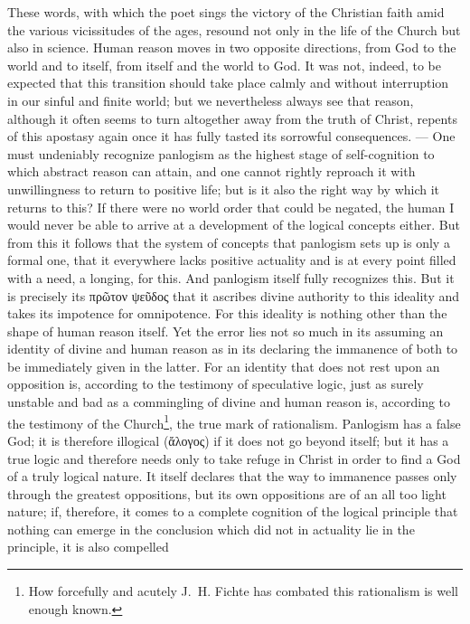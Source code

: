 \documentclass[12pt]{book}
\newcommand{\opage}[1]{\marginnote{\footnotesize\textit{[#1]}}}
\begin{document}
These words, with which the poet sings the victory of the Christian faith amid
the various vicissitudes of the ages, resound not only in the life of the Church
but also in science. Human reason moves in two opposite directions, from God to
the world and to itself, from itself and the world
\opage{144} \setcounter{footnote}{0}%
to God. It was not, indeed, to be expected that this transition should take
place calmly and without interruption in our sinful and finite world; but we
nevertheless always see that reason, although it often seems to turn altogether
away from the truth of Christ, repents of this apostasy again once it has fully
tasted its sorrowful consequences. --- One must undeniably recognize panlogism
as the highest stage of self-cognition to which abstract reason can attain, and
one cannot rightly reproach it with unwillingness to return to positive life;
but is it also the right way by which it returns to this? If there were no
world order that could be negated, the human I would never be able to arrive at
a development of the logical concepts either. But from this it follows that the
system of concepts that panlogism sets up is only a formal one, that it
everywhere lacks positive actuality and is at every point filled with a need, a
longing, for this. And panlogism itself fully recognizes this. But it is
precisely its πρῶτον ψεῦδος that it ascribes divine authority to this ideality
and takes its impotence for omnipotence. For this ideality is nothing other than
the shape of human reason itself. Yet the error lies not so much in its
assuming an identity of divine and human reason as in its declaring the
immanence of both to be immediately given in the latter. For an identity that
does not rest upon an opposition is, according to the testimony of speculative
logic, just as surely unstable and bad as a commingling of divine and human
reason is, according to the testimony of the Church\footnote{How forcefully and
acutely J.~H. Fichte has combated this rationalism is well enough known.}, the
true mark of rationalism.
\opage{145} %
Panlogism has a false God; it is therefore illogical (ἄλογος) if it does not go
beyond itself; but it has a true logic and therefore needs only to take refuge
in Christ in order to find a God of a truly logical nature. It itself declares
that the way to immanence passes only through the greatest oppositions, but its
own oppositions are of an all too light nature; if, therefore, it comes to a
complete cognition of the logical principle that nothing can emerge in the
conclusion which did not in actuality lie in the principle, it is also compelled
\end{document}

